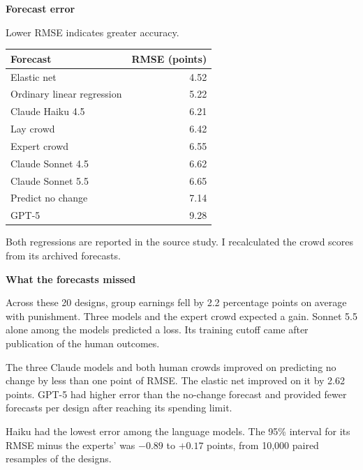 \documentclass[11pt,a4paper]{article}
\begin{document}
\vspace{6pt}
\noindent\begin{minipage}[t]{.48\textwidth}\vspace{0pt}
{\sffamily\bfseries\large\color{accent}Forecast error}\par
{\small Lower RMSE indicates greater accuracy.}\par
\vspace{3pt}
{\small\renewcommand{\arraystretch}{1.18}%
\begin{tabularx}{\linewidth}{@{}Xr@{}}
\toprule
\textbf{Forecast} & \textbf{RMSE (points)}\\
\midrule
Elastic net & 4.52\\
Ordinary linear regression & 5.22\\
Claude Haiku 4.5 & 6.21\\
Lay crowd & 6.42\\
Expert crowd & 6.55\\
Claude Sonnet 4.5 & 6.62\\
Claude Sonnet 5.5 & 6.65\\
Predict no change & 7.14\\
GPT-5 & 9.28\\
\bottomrule
\end{tabularx}}\par
{\footnotesize\color{muted} Both regressions are reported in the source study. I recalculated the crowd scores from its archived forecasts.}\par
\end{minipage}\hfill
\begin{minipage}[t]{.47\textwidth}\vspace{0pt}
\setlength{\parskip}{5pt}
{\sffamily\bfseries\large\color{accent}What the forecasts missed}\par
\raggedright
Across these 20 designs, group earnings fell by 2.2 percentage points on average with punishment. Three models and the expert crowd expected a gain. Sonnet 5.5 alone among the models predicted a loss. Its training cutoff came after publication of the human outcomes.

The three Claude models and both human crowds improved on predicting no change by less than one point of RMSE. The elastic net improved on it by 2.62 points. GPT-5 had higher error than the no-change forecast and provided fewer forecasts per design after reaching its spending limit.

Haiku had the lowest error among the language models. The 95\% interval for its RMSE minus the experts' was $-0.89$ to $+0.17$ points, from 10,000 paired resamples of the designs.
\end{minipage}
\end{document}
